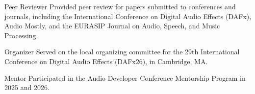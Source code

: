
\begin{cvskills}

\cvskill
    {Peer Reviewer} %
    {Provided peer review for papers submitted to conferences and journals, including
    the International Conference on Digital Audio Effects (DAFx), Audio Mostly,
    and the EURASIP Journal on Audio, Speech, and Music Processing.}

\cvskill
    {Organizer} %
    {Served on the local organizing committee for the 29th International
    Conference on Digital Audio Effects (DAFx26), in Cambridge, MA.}

\cvskill
    {Mentor} %
    {Participated in the Audio Developer Conference Mentorship Program in 2025 and 2026.}

\end{cvskills}
